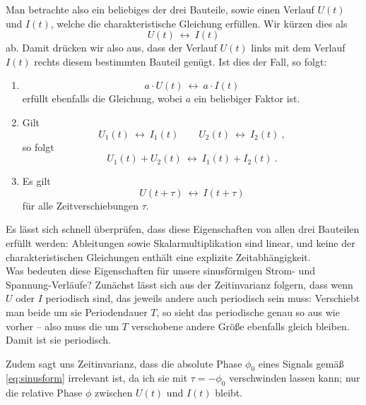 \def\llra{~\longleftrightarrow~}
Man betrachte also ein beliebiges der drei Bauteile, sowie einen Verlauf $U(t)$ und $I(t)$, welche die charakteristische Gleichung erfüllen. Wir kürzen dies als
$$U(t) \llra I(t)$$
ab. Damit drücken wir also aus, dass der Verlauf $U(t)$ links mit dem Verlauf $I(t)$ rechts diesem bestimmten Bauteil genügt.
Ist dies der Fall, so folgt:
\begin{enumerate}[label=(\arabic*)]
    \item
        \[ a\cdot U(t) \llra a \cdot I(t) \]
        erfüllt ebenfalls die Gleichung, wobei $a$ ein beliebiger Faktor ist.
    \item Gilt
        \[ U_1(t) \llra I_1(t) \qquad U_2(t) \llra I_2(t) ~,\]
        so folgt
        \[ U_1(t) + U_2(t) \llra I_1(t) + I_2(t) ~. \]
    \item Es gilt
        \[ U(t+\tau) \llra I(t+\tau) \]
        für alle Zeitverschiebungen $\tau$.
\end{enumerate}

Es lässt sich schnell überprüfen, dass diese Eigenschaften von allen drei Bauteilen erfüllt werden: Ableitungen sowie Skalarmultiplikation sind linear, und keine der charakteristischen Gleichungen enthält eine explizite Zeitabhängigkeit.
\\

Was bedeuten diese Eigenschaften für unsere sinusförmigen Strom- und Spannung-Verläufe? Zunächst lässt sich aus der Zeitinvarianz folgern, dass wenn $U$ oder $I$ periodisch sind, das jeweils andere auch periodisch sein muss: Verschiebt man beide um sie Periodendauer $T$, so sieht das periodische genau so aus wie vorher -- also muss die um $T$ verschobene andere Größe ebenfalls gleich bleiben. Damit ist sie periodisch.

Zudem sagt uns Zeitinvarianz, dass die absolute Phase $\phi_0$ eines Signals gemäß \eqref{eq:sinusform} irrelevant ist, da ich sie mit $\tau = -\phi_0$ verschwinden lassen kann; nur die relative Phase $\phi$ zwischen $U(t)$ und $I(t)$ bleibt.

